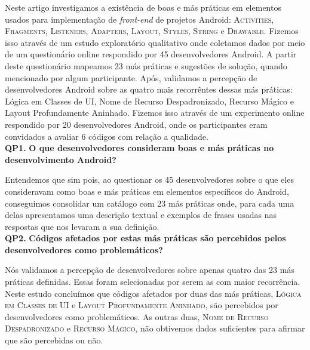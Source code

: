 Neste artigo investigamos a existência de boas e más práticas em elementos usados para implementação de \textit{front-end} de projetos Android: \textsc{Activities}, \textsc{Fragments}, \textsc{Listeners}, \textsc{Adapters}, \textsc{Layout}, \textsc{Styles}, \textsc{String} e \textsc{Drawable}. Fizemos isso através de um estudo exploratório qualitativo onde coletamos dados por meio de um questionário online respondido por 45 desenvolvedores Android. A partir deste questionário mapeamos 23 más práticas e sugestões de solução, quando mencionado por algum participante. Após, validamos a percepção de desenvolvedores Android sobre as quatro mais recorrêntes dessas más práticas: Lógica em Classes de UI, Nome de Recurso Despadronizado, Recurso Mágico e Layout Profundamente Aninhado. Fizemos isso através de um experimento online respondido por 20 desenvolvedores Android, onde os participantes eram convidados a avaliar 6 códigos com relação a qualidade. \\

\textbf{QP1.} \textbf{O que desenvolvedores consideram boas e más práticas no desenvolvimento Android?} 

Entendemos que sim pois, ao questionar os 45 desenvolvedores sobre o que eles consideravam como boas e más práticas em elementos específicos do Android, conseguimos consolidar um catálogo com 23 más práticas onde, para cada uma delas apresentamos uma descrição textual e exemplos de frases usadas nas respostas que nos levaram a sua definição. \\

\textbf{QP2.} \textbf{Códigos afetados por estas más práticas são percebidos pelos desenvolvedores como problemáticos?}

Nós validamos a percepção de desenvolvedores sobre apenas quatro das 23 más práticas definidas. Essas foram selecionadas por serem as com maior recorrência. Neste estudo concluímos que códigos afetados por duas das más práticas, \textsc{Lógica em Classes de UI} e \textsc{Layout Profundamente Aninhado}, são percebidos por desenvolvedores como problemáticos. As outras duas, \textsc{Nome de Recurso Despadronizado} e \textsc{Recurso Mágico}, não obtivemos dados suficientes para afirmar que são percebidas ou não.



